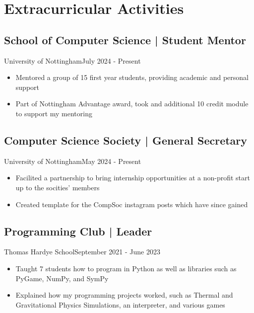 \section{Extracurricular Activities}
\subsection{School of Computer Science | Student Mentor}{University of Nottingham}{July 2024 - Present}
\begin{itemize}
    \item Mentored a group of 15 first year students, providing academic and personal support
    \item Part of Nottingham Advantage award, took and additional 10 credit module to support my mentoring
\end{itemize}
\subsection{Computer Science Society | General Secretary}{University of Nottingham}{May 2024 - Present}
\begin{itemize}
    \item Facilited a partnership to bring internship opportunities at a non-profit start up to the socities' members
    \item Created template for the CompSoc instagram posts which have since gained
\end{itemize}
\subsection{Programming Club | Leader}{Thomas Hardye School}{September 2021 - June 2023}
\begin{itemize}
    \item Taught 7 students how to program in Python as well as libraries such as PyGame, NumPy, and SymPy
    \item Explained how my programming projects worked, such as Thermal and Gravitational Physics Simulations, an interpreter, and various games
\end{itemize}
\vspace{.3em}
